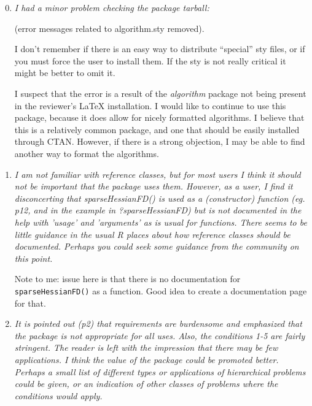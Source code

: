\documentclass{article}
\newcommand{\pkg}[1]{\emph{#1}}
\newcommand{\code}[1]{\texttt{#1}}
\newcommand{\func}[1]{\code{#1}}
\newenvironment{revQuote}{\itshape}{\vspace{\baselineskip}}
\newenvironment{response}{\normalfont}{\vspace{\baselineskip}}
\begin{document}
\begin{enumerate}
 \setcounter{enumi}{-1}

\item \begin{revQuote}
I had a minor problem checking the package tarball:

{\normalfont (error messages related to algorithm.sty removed).}

I don't remember if there is an easy way to distribute ``special'' sty files,
or if you must force the user to install them. If the sty is not really
critical it might be better to omit it.  
  
\end{revQuote}

\begin{response}
I suspect that the error is a result of the \pkg{algorithm} package
not being present in the reviewer's LaTeX installation.  I would like
to continue to use this package,
because it does allow for nicely formatted algorithms.  I believe that this is
a relatively common package, and one that should be easily installed
through CTAN.  However, if there is a strong
objection, I may be able to find another way to format the algorithms.
\end{response}

\item \begin{revQuote}
I am not familiar with reference classes, but for most users I think it
should not be important that the package uses them. However, as a user, I
find it disconcerting that sparseHessianFD() is used as a (constructor)
function (eg. p12, and in the example in ?sparseHessianFD) but is not
documented in the help with 'usage' and 'arguments' as is usual for
functions. There seems to be little guidance in the usual R places about how
reference classes should be documented. Perhaps you could seek some guidance
from the community on this point.
\end{revQuote}


\begin{response}

  Note to me:  issue here is that there is no documentation for
  \func{sparseHessianFD()} as a function.  Good idea to create a
  documentation page for that.

  
\end{response}



\item \begin{revQuote}
It is pointed out (p2) that requirements are burdensome and emphasized
that the package is not appropriate for all uses. Also, the conditions 1-5
are fairly stringent. The reader is left with the impression that there may
be few applications. I think the value of the package could be promoted
better. Perhaps a small list of different types or applications of
hierarchical problems could be given, or an indication of other classes of
problems where the conditions would apply.
    

\end{revQuote}
\end{enumerate}
\end{document}
